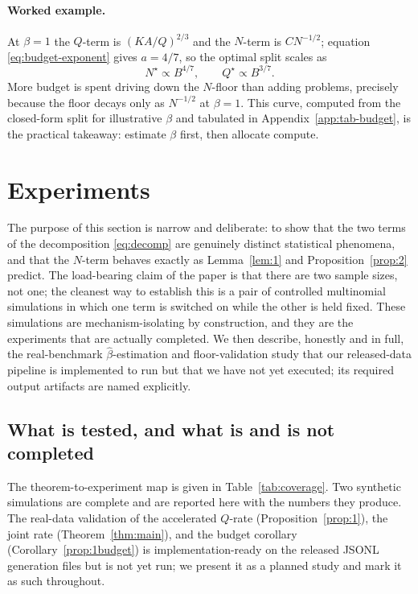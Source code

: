 \documentclass{article} %
\begin{document}
\paragraph{Worked example.}
At $\beta=1$ the $Q$-term is $(KA/Q)^{2/3}$ and the $N$-term is $C N^{-1/2}$;
equation \eqref{eq:budget-exponent} gives $a = 4/7$, so the optimal split scales as
\begin{equation}
\label{eq:budget-ex}
N^\star \propto B^{4/7}, \qquad Q^\star \propto B^{3/7}.
\end{equation}
More budget is spent driving down the $N$-floor than adding problems, precisely
because the floor decays only as $N^{-1/2}$ at $\beta=1$. This curve, computed from the closed-form split for
illustrative $\beta$ and tabulated in Appendix~\ref{app:tab-budget}, is the practical takeaway:
estimate $\beta$ first, then allocate compute.


\section{Experiments}
\label{sec:experiments}

The purpose of this section is narrow and deliberate: to show that the two
terms of the decomposition \eqref{eq:decomp} are genuinely distinct
statistical phenomena, and that the $N$-term behaves exactly as
Lemma~\ref{lem:1} and Proposition~\ref{prop:2} predict. The load-bearing claim of
the paper is that there are two sample sizes, not one; the cleanest way to
establish this is a pair of controlled multinomial simulations in which one
term is switched on while the other is held fixed. These simulations are
mechanism-isolating by construction, and they are the experiments that are
actually completed. We then describe, honestly and in full, the real-benchmark
$\hat\beta$-estimation and floor-validation study that our released-data pipeline
is implemented to run but that we have not yet executed; its required output
artifacts are named explicitly.

\subsection{What is tested, and what is and is not completed}
\label{sec:exp-map}

The theorem-to-experiment map is given in Table~\ref{tab:coverage}. Two synthetic
simulations are complete and are reported here with the numbers they produce. The
real-data validation of the accelerated $Q$-rate (Proposition~\ref{prop:1}), the
joint rate (Theorem~\ref{thm:main}), and the budget corollary
(Corollary~\ref{prop:1budget}) is implementation-ready on the released JSONL
generation files but is not yet run; we present it as a planned study and mark it
as such throughout.
\end{document}
